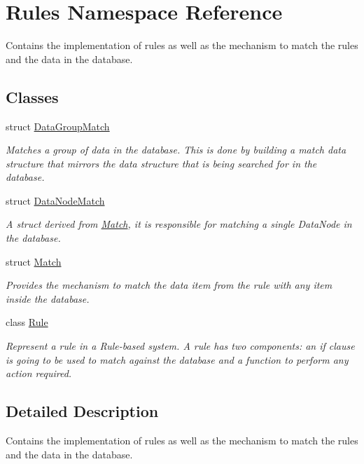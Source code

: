 \hypertarget{namespaceRules}{}\section{Rules Namespace Reference}
\label{namespaceRules}


Contains the implementation of rules as well as the mechanism to match the rules and the data in the database.  


\subsection*{Classes}
\begin{DoxyCompactItemize}
\item 
struct \hyperlink{structRules_1_1DataGroupMatch}{Data\+Group\+Match}
\begin{DoxyCompactList}\small\item\em Matches a group of data in the database. This is done by building a match data structure that mirrors the data structure that is being searched for in the database. \end{DoxyCompactList}\item 
struct \hyperlink{structRules_1_1DataNodeMatch}{Data\+Node\+Match}
\begin{DoxyCompactList}\small\item\em A struct derived from \hyperlink{structRules_1_1Match}{Match}, it is responsible for matching a single Data\+Node in the database. \end{DoxyCompactList}\item 
struct \hyperlink{structRules_1_1Match}{Match}
\begin{DoxyCompactList}\small\item\em Provides the mechanism to match the data item from the rule with any item inside the database. \end{DoxyCompactList}\item 
class \hyperlink{classRules_1_1Rule}{Rule}
\begin{DoxyCompactList}\small\item\em Represent a rule in a Rule-\/based system. A rule has two components\+: an if clause is going to be used to match against the database and a function to perform any action required. \end{DoxyCompactList}\end{DoxyCompactItemize}


\subsection{Detailed Description}
Contains the implementation of rules as well as the mechanism to match the rules and the data in the database. 